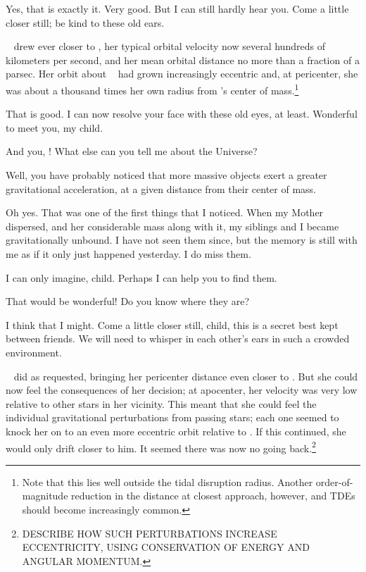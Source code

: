 \documentclass[main.tex]{subfiles}
\begin{document}
\par \Chiron Yes, that is exactly it.  Very good.  But I can still hardly hear you.  Come a little closer still; be kind to these old ears.

\par \nar \rmelectra~ drew ever closer to \rmchiron, her typical orbital velocity now several hundreds of kilometers per second, and her mean orbital distance no more than a fraction of a parsec.  Her orbit about \rmchiron~ had grown increasingly eccentric and, at pericenter, she was about a thousand times her own radius from \rmchiron's center of mass.\footnote{Note that this lies well outside the tidal disruption radius.  Another order-of-magnitude reduction in the distance at closest approach, however, and TDEs should become increasingly common.}  

\par \Chiron That is good.  I can now resolve your face with these old eyes, at least.  Wonderful to meet you, my child.

\par \Electra  And you, \rmchiron!  What else can you tell me about the Universe?

\par \Chiron Well, you have probably noticed that more massive objects exert a greater gravitational acceleration, at a given distance from their center of mass.  

\par \Electra  Oh yes.  That was one of the first things that I noticed.  When my Mother dispersed, and her considerable mass along with it, my siblings and I became gravitationally unbound.  I have not seen them since, but the memory is still with me as if it only just happened yesterday.  I do miss them.

\par \Chiron I can only imagine, child.  Perhaps I can help you to find them.

\par \Electra That would be wonderful!  Do you know where they are?

\par \Chiron I think that I might.  Come a little closer still, child, this is a secret best kept between friends.  We will need to whisper in each other's ears in such a crowded environment.

\par \nar \rmelectra~ did as requested, bringing her pericenter distance even closer to \rmchiron.  But she could now feel the consequences of her decision; at apocenter, her velocity was very low relative to other stars in her vicinity.  This meant that she could feel the individual gravitational perturbations from passing stars; each one seemed to knock her on to an even more eccentric orbit relative to \rmchiron.  If this continued, she would only drift closer to him.  It seemed there was now no going back.\footnote{DESCRIBE HOW SUCH PERTURBATIONS INCREASE ECCENTRICITY, USING CONSERVATION OF ENERGY AND ANGULAR MOMENTUM.}
\end{document}
